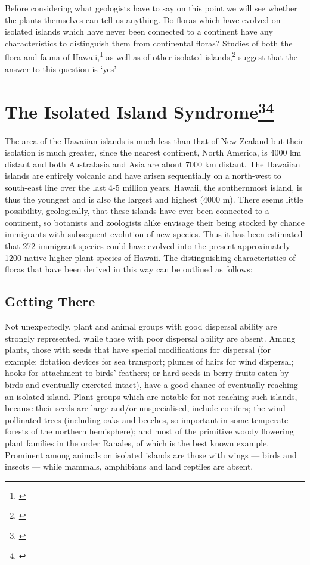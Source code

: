 Before considering what geologists have to say on this point we will see whether the plants themselves can tell us anything.
Do floras which have evolved on isolated islands which have never been connected to a continent have any characteristics to distinguish them from continental floras? Studies of both the flora and fauna of Hawai{\okina}i,\footnote{\cite{carlquist1970hawaii}} as well as of other isolated islands,\footnote{\cite{carlquist1965island}} suggest that the answer to this question is `yes'

\section[The Isolated Island Syndrome]{The Isolated Island Syndrome\footnote{\cite{ehrendorfer1979reproductive}}\footnote{\cite{lloyd1985progress}}}

The area of the Hawaiian islands is much less than that of New Zealand but their isolation is much greater, since the nearest continent, North America, is 4000 km distant and both Australasia and Asia are about 7000 km distant.
The Hawaiian islands are entirely volcanic and have arisen sequentially on a north-west to south-east line over the last 4-5 million years.
Hawai{\okina}i, the southernmost island, is thus the youngest and is also the largest and highest (4000 m).
There seems little possibility, geologically, that these islands have ever been connected to a continent, so botanists and zoologists alike envisage their being stocked by chance immigrants with subsequent evolution of new species.
Thus it has been estimated that 272 immigrant species could have evolved into the present approximately 1200 native higher plant species of Hawai{\okina}i.
The distinguishing characteristics of floras that have been derived in this way can be outlined as follows:

\subsection{Getting There}

Not unexpectedly, plant and animal groups with good dispersal ability are strongly represented, while those with poor dispersal ability are absent.
Among plants, those with seeds that have special modifications for dispersal (for example: flotation devices for sea transport; plumes of hairs for wind dispersal; hooks for attachment to birds' feathers; or hard seeds in berry fruits eaten by birds and eventually excreted intact), have a good chance of eventually reaching an isolated island.
Plant groups which are notable for not reaching such islands, because their seeds are large and/or unspecialised, include conifers; the wind pollinated trees (including oaks and beeches, so important in some temperate forests of the northern hemisphere); and most of the primitive woody flowering plant families in the order Ranales, of which  is the best known example.
Prominent among animals on isolated islands are those with wings — birds and insects — while mammals, amphibians and land reptiles are absent.

